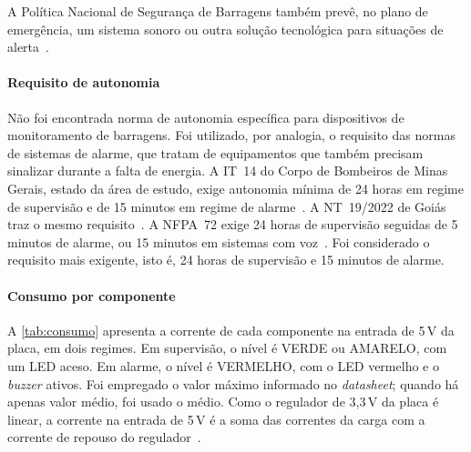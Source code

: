 A Política Nacional de Segurança de Barragens também prevê, no plano de
emergência, um sistema sonoro ou outra solução tecnológica para situações
de alerta~\cite{brasil2010pnsb,brasil2020lei14066}.

\paragraph*{Requisito de autonomia}

Não foi encontrada norma de autonomia específica para dispositivos de
monitoramento de barragens. Foi utilizado, por analogia, o requisito das
normas de sistemas de alarme, que tratam de equipamentos que também
precisam sinalizar durante a falta de energia.
A IT~14 do Corpo de Bombeiros de Minas Gerais, estado da área de estudo,
exige autonomia mínima de 24 horas em regime de supervisão e de 15
minutos em regime de alarme~\cite[item~5.3]{cbmmg2017it14}. A NT~19/2022
de Goiás traz o mesmo requisito~\cite[item~5.3]{cbmgo2022nt19}.
A NFPA~72 exige 24 horas de supervisão seguidas de 5 minutos de alarme,
ou 15 minutos em sistemas com voz~\cite{hammerberg2021calculation,reiswig2023nfpa72}. Foi considerado o requisito mais exigente, isto é, 24 horas de supervisão e 15 minutos de alarme.

\paragraph*{Consumo por componente}

A \autoref{tab:consumo} apresenta a corrente de cada componente na
entrada de 5\,V da placa, em dois regimes. Em supervisão, o nível é VERDE
ou AMARELO, com um LED aceso. Em alarme, o nível é VERMELHO, com o LED
vermelho e o \textit{buzzer} ativos.
Foi empregado o valor máximo informado no \textit{datasheet}; quando há
apenas valor médio, foi usado o médio. Como o regulador de 3,3\,V da placa é
linear, a corrente na entrada de 5\,V é a soma das correntes da carga com
a corrente de repouso do regulador~\cite{ams1117_datasheet}.

